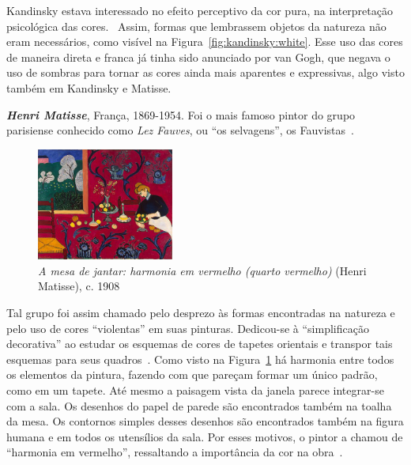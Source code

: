 Kandinsky estava interessado no efeito
perceptivo da cor pura, na interpretação psicológica das
cores.~\cite{ione} Assim, formas que lembrassem objetos da natureza
não eram necessários, como visível na
Figura~\ref{fig:kandinsky:white}. Esse uso das cores de maneira direta
e franca já tinha sido anunciado por van Gogh, que negava o uso de
sombras para tornar as cores ainda mais aparentes e expressivas, algo
visto também em Kandinsky e Matisse.


\textbf{\emph{Henri Matisse}}, França, 1869-1954. Foi o mais famoso
pintor do grupo parisiense conhecido como \textit{Lez Fauves}, ou ``os
selvagens'', os Fauvistas~\cite{elderfield,freeman}. 

\begin{figure}
  \begin{center}
    \includegraphics[width=0.4\textwidth]{figs/matisse_red.png}
  \end{center}
  \caption{\emph{A mesa de jantar: harmonia em vermelho (quarto vermelho)} (Henri Matisse), c. 1908}
  \label{fig:matisse:red}
\end{figure}

Tal grupo foi assim chamado pelo desprezo às formas encontradas na
natureza e pelo uso de cores ``violentas'' em suas
pinturas. Dedicou-se à ``simplificação decorativa'' ao estudar os
esquemas de cores de tapetes orientais e transpor tais esquemas para
seus quadros~\cite{gombrich}. Como visto na
Figura~\ref{fig:matisse:red} há harmonia entre todos os elementos da
pintura, fazendo com que pareçam formar um único padrão, como em um
tapete. Até mesmo a paisagem vista da janela parece integrar-se com a
sala. Os desenhos do papel de parede são encontrados também na toalha
da mesa. Os contornos simples desses desenhos são encontrados também
na figura humana e em todos os utensílios da sala. Por esses motivos,
o pintor a chamou de ``harmonia em vermelho'', ressaltando a
importância da cor na obra~\cite{matisse}.


